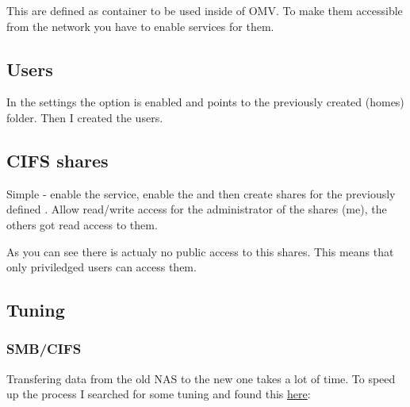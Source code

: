 
This  are defined as container to be used inside
of \gls{OMV}. To make them accessible from the network you have to enable
services for them.

\subsection{Users}

In the settings the option  is enabled and
points to the previously created \tsFontCode(homes) folder. Then I created
the users.


\subsection{CIFS shares}

Simple - enable the  service, enable the  and then create shares for the previously defined . Allow read/write access for the administrator of the shares (me),
the others got read access to them.



As you can see there is actualy no public access to this shares. This means
that only priviledged users can access them.

\subsection{Tuning}

\subsubsection{SMB/CIFS}

Transfering data from the old \gls{NAS} to the new one takes a lot of time. To
speed up the process I searched for some tuning and found this
\href{https://techie-show.com/open-media-vault-smb-performance-quick-win/}{here}:

